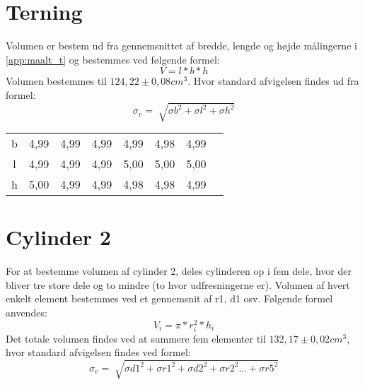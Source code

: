 \label{app:ref_obj_maalt}
\section{Terning}
Volumen er bestem ud fra gennemsnittet af bredde, lengde og højde målingerne i \vref{app:maalt_t} og bestemmes ved følgende formel:
\begin{equation}
V=l*b*h
\end{equation}
Volumen bestemmes til $124,22 \pm 0,08 cm^3$. 
Hvor standard afvigelsen findes ud fra formel:
\begin{equation}
\sigma_v=\sqrt[]{\sigma{b}^2+\sigma{l}^2+\sigma{h}^2}
\end{equation}
\begin{table}[h]
 \centering
\label{app:maalt_t}  
\begin{tabular}{c c c c c c c c}
\toprule
b&4,99&	4,99&	4,99&	4,99&	4,98&	4,99&\\
l&	4,99&	4,99&	4,99&	5,00&	5,00&	5,00&\\
h&	5,00&	4,99&	4,99&	4,98&	4,98&	4,99&\\
\bottomrule
\end{tabular}
\end{table}

\section{Cylinder 2}
For at bestemme volumen af cylinder 2, deles cylinderen op i fem dele, hvor der bliver tre store dele og to mindre (to hvor udfresningerne er). Volumen af hvert enkelt element bestemmes ved et gennemsnit af r1, d1 osv. 
Følgende formel anvendes:
\begin{equation}
V_i=\pi*r_i^2*h_i
\end{equation}
Det totale volumen findes ved at summere fem elementer til $132,17 \pm 0,02 cm^3$, hvor standard afvigelsen findes ved formel:
\begin{equation}
\sigma_v=\sqrt[]{\sigma{d1}^2+\sigma{r1}^2+\sigma{d2}^2+\sigma{r2}^2...+\sigma{r5}^2}	
\end{equation}

